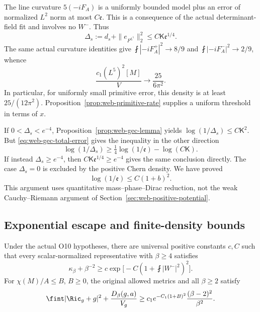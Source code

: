 The line curvature \(5(-iF_A)\) is a uniformly bounded model plus an
error of normalized \(L^2\) norm at most \(C\mathfrak e\).  This is a
consequence of the actual determinant-field fit and involves no \(W^-\).
Thus
\begin{equation}
 \Delta_s:=d_s+\|e_{F^{L^5}}\|_2^2
       \le C\mathsf K\mathfrak e^{1/4}.
 \label{eq:web-gec-total-error}
\end{equation}
The same actual curvature identities give
\(\fint|-iF_A^+|^2\to8/9\) and
\(\fint|-iF_A^-|^2\to2/9\), whence
\begin{equation}
 \frac{c_1(L^5)^2[M]}V\longrightarrow\frac{25}{6\pi^2}.
 \label{eq:web-gec-chern-density}
\end{equation}
In particular, for uniformly small primitive error, this density is at least
\(25/(12\pi^2)\).  Proposition~\ref{prop:web-primitive-rate} supplies
a uniform threshold in terms of \(x\).

If \(0<\Delta_s<e^{-4}\), Proposition~\ref{prop:web-gec-lemma} yields
\(\log(1/\Delta_s)\le C\mathsf K^2\).  But
\eqref{eq:web-gec-total-error} gives the inequality in the other direction
\[
 \log(1/\Delta_s)\ge\tfrac14\log(1/\mathfrak e)-\log(C\mathsf K).
\]
If instead \(\Delta_s\ge e^{-4}\), then
\(C\mathsf K\mathfrak e^{1/4}\ge e^{-4}\) gives the same conclusion
directly.  The case \(\Delta_s=0\) is excluded by the positive Chern
density.  We have proved
\begin{equation}
 \log(1/\mathfrak e)\le C(1+b)^2.
 \label{eq:web-gec-primitive-obstruction}
\end{equation}
This argument uses quantitative mass--phase--Dirac reduction, not the weak
Cauchy--Riemann argument of Section~\ref{sec:web-positive-potential}.

\subsection{Exponential escape and finite-density bounds}

\begin{corollary}
\label{cor:web-gec-exponential}
Under the actual O10 hypotheses, there are universal positive constants
\(c,C\) such that every scalar-normalized representative with \(\beta\ge4\)
satisfies
\begin{equation}
 \kappa_\beta+\beta^{-2}\ge
       c\exp\bigl[-C(1+\fint|W^-|^2)^2\bigr].
 \label{eq:web-gec-exponential-escape}
\end{equation}
For \(\chi(M)/A\le B\), \(B\ge0\), the original allowed metrics
and all \(\beta\ge2\) satisfy
\begin{equation}
 \fint|\Ric_g+g|^2+\frac{D_\beta(g,a)}{V_g}
 \ge c_1e^{-C_1(1+B)^2}\frac{(\beta-2)^2}{\beta^2}.
 \label{eq:web-gec-exponential-density}
\end{equation}
\end{corollary}

